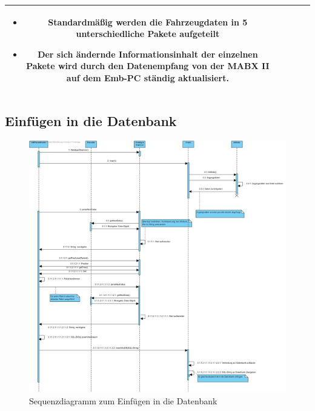 \documentclass[fontsize = 12pt, paper = a4]{scrreprt}
\begin{document}
\begin{table}[H]
\begin{tabular}{c | p{4cm} | p{1.5cm} | p{2cm} | p{4cm} }
\begin{itemize}[leftmargin=*]

\item Standardmäßig werden die Fahrzeugdaten in 5 unterschiedliche Pakete aufgeteilt

\item Der sich ändernde Informationsinhalt der einzelnen Pakete wird durch den Datenempfang von der MABX II auf dem Emb-PC ständig aktualisiert.

\end{itemize} \\

\bottomrule[1.5pt]

\end{tabular}

\end{table}

\newpage



\subsection{Einfügen in die Datenbank}

\begin{figure}[h]
\centering
\includegraphics[scale = 0.5]{Datenbank_einfuegen}
\caption[Sequenzdiagramm zum Einfügen in die Datenbank]{Sequenzdiagramm zum Einfügen in die Datenbank}
\label{classvServer}
\end{figure}
\end{document}
